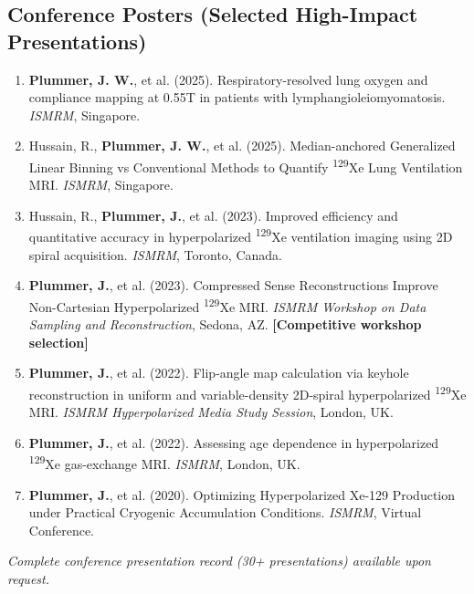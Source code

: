 \documentclass[11pt,]{scrartcl}
\begin{document}
\subsection{Conference Posters (Selected High-Impact Presentations)}

\begin{enumerate}
  \leftskip-0.13in

    \item \textbf{Plummer, J. W.}, et al. (2025). Respiratory-resolved lung oxygen and compliance mapping at 0.55T in patients with lymphangioleiomyomatosis. \textit{ISMRM}, Singapore.

    \item Hussain, R., \textbf{Plummer, J. W.}, et al. (2025). Median-anchored Generalized Linear Binning vs Conventional Methods to Quantify \textsuperscript{129}Xe Lung Ventilation MRI. \textit{ISMRM}, Singapore.

    \item Hussain, R., \textbf{Plummer, J.}, et al. (2023). Improved efficiency and quantitative accuracy in hyperpolarized \textsuperscript{129}Xe ventilation imaging using 2D spiral acquisition. \textit{ISMRM}, Toronto, Canada.
    
    \item \textbf{Plummer, J.}, et al. (2023). Compressed Sense Reconstructions Improve Non-Cartesian Hyperpolarized \textsuperscript{129}Xe MRI. \textit{ISMRM Workshop on Data Sampling and Reconstruction}, Sedona, AZ. \textbf{[Competitive workshop selection]}
  
    \item \textbf{Plummer, J.}, et al. (2022). Flip-angle map calculation via keyhole reconstruction in uniform and variable-density 2D-spiral hyperpolarized \textsuperscript{129}Xe MRI. \textit{ISMRM Hyperpolarized Media Study Session}, London, UK.
  
    \item \textbf{Plummer, J.}, et al. (2022). Assessing age dependence in hyperpolarized \textsuperscript{129}Xe gas-exchange MRI. \textit{ISMRM}, London, UK.

    \item \textbf{Plummer, J.}, et al. (2020). Optimizing Hyperpolarized Xe-129 Production under Practical Cryogenic Accumulation Conditions. \textit{ISMRM}, Virtual Conference.
    
\end{enumerate}

\noindent\textit{Complete conference presentation record (30+ presentations) available upon request.}
\end{document}
